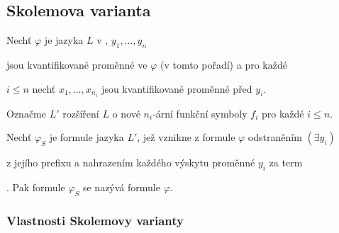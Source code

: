 \subsection{Skolemova varianta}\todo


Nechť $\varphi$ je  jazyka $L$ v , $y_1,\dots,y_n$
\smallskip

jsou  kvantifikované proměnné ve $\varphi$ (v tomto pořadí) a pro každé
\smallskip

$i\le n$ nechť $x_1,\dots,x_{n_i}$ jsou  kvantifikované proměnné před $y_i$.
\smallskip

Označme $L'$ rozšíření $L$ o nové $n_i$-ární funkční symboly $f_i$ pro každé $i\le n$.
\bigskip

Nechť $\varphi_S$ je formule jazyka $L'$, jež vznikne z formule $\varphi$ odstraněním $(\exists y_i)$
\smallskip

 z jejího prefixu a nahrazením každého výskytu proměnné $y_i$ za term
\smallskip

. Pak formule $\varphi_S$ se nazývá  formule $\varphi$.
\bigskip

{\it {}
\vspace{-2mm}

\vspace{-6mm}
\vspace{-2mm}

\vspace{-6mm}
}





\subsubsection*{Vlastnosti Skolemovy varianty}

